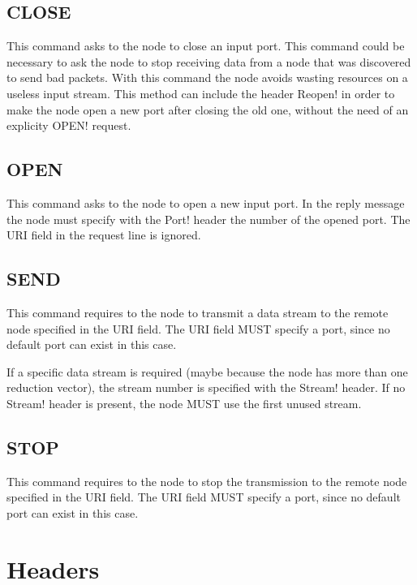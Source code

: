 \subsection{CLOSE}
\label{subsub:close;transport_layer}

This command asks to the node to close an input port.  This command
could be necessary to ask the node to stop receiving data from a node
that was discovered to send bad packets.  With this command the node
avoids wasting resources on a useless input stream.  This method can
include the header \ttt Reopen! in order to make the node open a new
port after closing the old one, without the need of an explicity \ttt
OPEN! request.

\subsection{OPEN}
\label{subsub:open;transport_layer}

This command asks to the node to open a new input port.  In the reply
message the node must specify with the \ttt Port! header the number of
the opened port.  The URI field in the request line is ignored.

\subsection{SEND}
\label{subsub:send;transport_layer}

This command requires to the node to transmit a data stream to the
remote node specified in the URI field.  The URI field MUST specify a
port, since no default port can exist in this case.

If a specific data stream is required (maybe because the node has more
than one reduction vector), the stream number is specified with the
\ttt Stream! header.  If no \ttt Stream! header is present, the node
MUST use the first unused stream.

\subsection{STOP}
\label{subsub:stop;transport_layer}

This command requires to the node to stop the transmission to the
remote node specified in the URI field.  The URI field MUST specify a
port, since no default port can exist in this case.


\section{Headers}
\label{sub:7.1;transport_layer}

